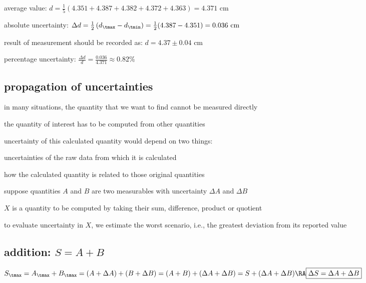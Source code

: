 
\sol average value: $d = \frac{1}{5}(4.351+4.387+4.382+4.372+4.363) = 4.371 \text{ cm}$

absolute uncertainty: $\Delta d = \frac{1}{2}\left(d_\tmax-d_\tmin\right) = \frac{1}{2}(4.387-4.351) = 0.036 \text{ cm}$

result of measurement should be recorded as: $ d = 4.37 \pm 0.04 \text{ cm}$

percentage uncertainty: $\frac{\Delta d}{d} = \frac{0.036}{4.371} \approx 0.82\%$   \eoe




\subsection{propagation of uncertainties}

in many situations, the quantity that we want to find cannot be measured directly

the quantity of interest has to be computed from other quantities

uncertainty of this calculated quantity would depend on two things:

\titem uncertainties of the raw data from which it is calculated

\titem how the calculated quantity is related to those original quantities

\vspace*{\baselineskip}

suppose quantities $A$ and $B$ are two measurables with uncertainty $\Delta A$ and $\Delta B$ 

$X$ is a quantity to be computed by taking their sum, difference, product or quotient

to evaluate uncertainty in $X$, we estimate the worst scenario, i.e., the greatest deviation from its reported value

\subsection*{addition: $S=A+B$}

$S_\tmax = A_\tmax + B_\tmax = (A + \Delta A) + (B + \Delta B) = (A+B) + (\Delta A + \Delta B)= S + (\Delta A + \Delta B) \RA \boxed{\Delta S = \Delta A + \Delta B}$

